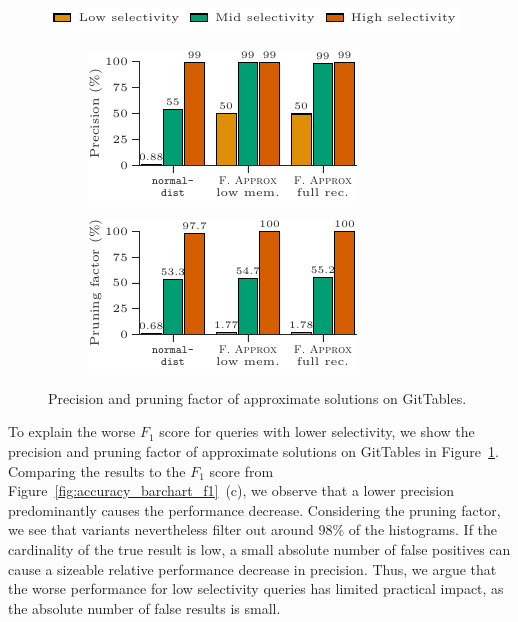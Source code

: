 \begin{figure}[t]
    \setlength{\belowcaptionskip}{-1mm}
    \centering
    \includegraphics{figures/figure_17_legend.pdf}\\
    \begin{subfigure}[t]{.49\linewidth}
        \centering
        \includegraphics[scale=0.91]{figures/figure_17_a.pdf}
    \end{subfigure}%
    \hfill%
    \begin{subfigure}[t]{.49\linewidth}
        \centering
        \includegraphics[scale=0.91]{figures/figure_17_b.pdf}
    \end{subfigure}%
    \caption{Precision and pruning factor of approximate solutions on GitTables.}
    \label{fig:accuracy_barchart_approx}
\end{figure}

To explain the worse $F_1$ score for queries with lower selectivity, we show the precision and pruning factor of approximate solutions on GitTables in Figure~\ref{fig:accuracy_barchart_approx}.
Comparing the results to the $F_1$ score from Figure~\ref{fig:accuracy_barchart_f1}~(c), we observe that a lower precision predominantly causes the performance decrease.
Considering the pruning factor, we see that \approximate{} variants nevertheless filter out around 98\% of the histograms.
If the cardinality of the true result is low, a small absolute number of false positives can cause a sizeable relative performance decrease in precision.
Thus, we argue that the worse performance for low selectivity queries has limited practical impact, as the absolute number of false results is small.

